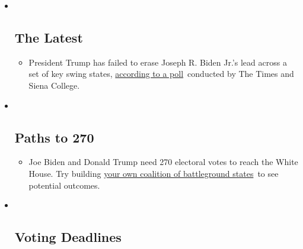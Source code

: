 \begin{itemize}
\item ~
  \hypertarget{the-latest}{%
  \subsection{The Latest}\label{the-latest}}

  \begin{itemize}
  \item
    President Trump has failed to erase Joseph R. Biden Jr.'s lead
    across a set of key swing states,
    \href{https://www.nytimes3xbfgragh.onion/2020/09/12/us/politics/biden-trump-poll-wisconsin-minnesota.html?action=click\&pgtype=Article\&state=default\&region=BELOW_MAIN_CONTENT\&context=storylines_guide}{according
    to a poll}~conducted by The Times and Siena College.
  \end{itemize}
\item ~
  \hypertarget{paths-to-270}{%
  \subsection{Paths to 270}\label{paths-to-270}}

  \begin{itemize}
  \item
    Joe Biden and Donald Trump need 270 electoral votes to reach the
    White House. Try building
    \href{https://www.nytimes3xbfgragh.onion/interactive/2020/us/elections/election-states-biden-trump.html?action=click\&pgtype=Article\&state=default\&region=BELOW_MAIN_CONTENT\&context=storylines_guide}{your
    own coalition of battleground states}~to see potential outcomes.
  \end{itemize}
\item ~
  \hypertarget{voting-deadlines}{%
  \subsection{Voting Deadlines}\label{voting-deadlines}}


\end{itemize}
